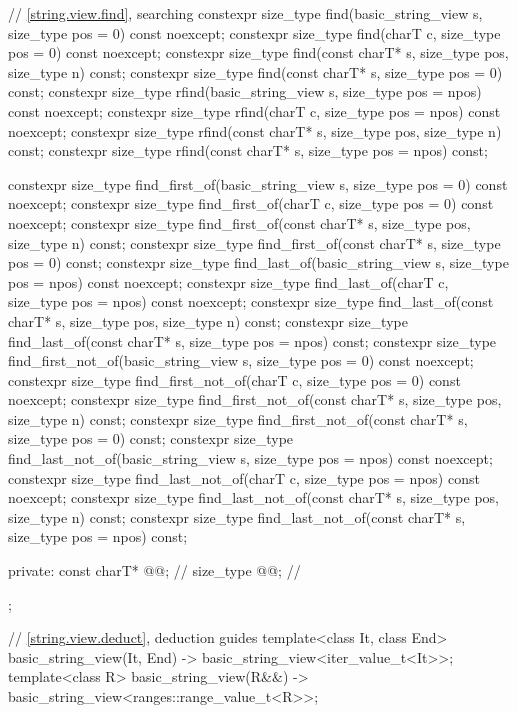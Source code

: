 \begin{codeblock}
{{    // \ref{string.view.find}, searching
    constexpr size_type find(basic_string_view s, size_type pos = 0) const noexcept;
    constexpr size_type find(charT c, size_type pos = 0) const noexcept;
    constexpr size_type find(const charT* s, size_type pos, size_type n) const;
    constexpr size_type find(const charT* s, size_type pos = 0) const;
    constexpr size_type rfind(basic_string_view s, size_type pos = npos) const noexcept;
    constexpr size_type rfind(charT c, size_type pos = npos) const noexcept;
    constexpr size_type rfind(const charT* s, size_type pos, size_type n) const;
    constexpr size_type rfind(const charT* s, size_type pos = npos) const;

    constexpr size_type find_first_of(basic_string_view s, size_type pos = 0) const noexcept;
    constexpr size_type find_first_of(charT c, size_type pos = 0) const noexcept;
    constexpr size_type find_first_of(const charT* s, size_type pos, size_type n) const;
    constexpr size_type find_first_of(const charT* s, size_type pos = 0) const;
    constexpr size_type find_last_of(basic_string_view s, size_type pos = npos) const noexcept;
    constexpr size_type find_last_of(charT c, size_type pos = npos) const noexcept;
    constexpr size_type find_last_of(const charT* s, size_type pos, size_type n) const;
    constexpr size_type find_last_of(const charT* s, size_type pos = npos) const;
    constexpr size_type find_first_not_of(basic_string_view s, size_type pos = 0) const noexcept;
    constexpr size_type find_first_not_of(charT c, size_type pos = 0) const noexcept;
    constexpr size_type find_first_not_of(const charT* s, size_type pos,
                                          size_type n) const;
    constexpr size_type find_first_not_of(const charT* s, size_type pos = 0) const;
    constexpr size_type find_last_not_of(basic_string_view s,
                                         size_type pos = npos) const noexcept;
    constexpr size_type find_last_not_of(charT c, size_type pos = npos) const noexcept;
    constexpr size_type find_last_not_of(const charT* s, size_type pos,
                                         size_type n) const;
    constexpr size_type find_last_not_of(const charT* s, size_type pos = npos) const;

  private:
    const charT* @@;         // \expos
    size_type @@;            // \expos
  };

  // \ref{string.view.deduct}, deduction guides
  template<class It, class End>
    basic_string_view(It, End) -> basic_string_view<iter_value_t<It>>;
  template<class R>
    basic_string_view(R&&) -> basic_string_view<ranges::range_value_t<R>>;
}
\end{codeblock}

